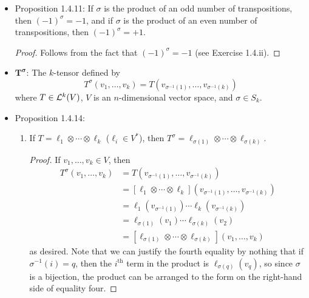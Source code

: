 \documentclass[../notes.tex]{subfiles}
\begin{document}
\begin{itemize}
\begin{proof}
\begin{align*}
            &= \prod_{i<j}\frac{x_{\sigma_1(p)}-x_{\sigma_1(q)}}{x_p-x_q}\cdot\prod_{i<j}\frac{x_{\sigma_2(i)}-x_{\sigma_2(j)}}{x_i-x_j}\\
            &= (-1)^{\sigma_1}(-1)^{\sigma_2}
        \end{align*}
        as desired.
    \end{proof}
    \item Proposition 1.4.11: If $\sigma$ is the product of an odd number of transpositions, then $(-1)^\sigma=-1$, and if $\sigma$ is the product of an even number of transpositions, then $(-1)^\sigma=+1$.
    \begin{proof}
        Follows from the fact that $(-1)^\sigma=-1$ (see Exercise 1.4.ii).
    \end{proof}
    \item $\bm{T^\sigma}$: The $k$-tensor defined by
    \begin{equation*}
        T^\sigma(v_1,\dots,v_k) = T(v_{\sigma^{-1}(1)},\dots,v_{\sigma^{-1}(k)})
    \end{equation*}
    where $T\in\lin[k]{V}$, $V$ is an $n$-dimensional vector space, and $\sigma\in S_k$.
    \item Proposition 1.4.14:
    \begin{enumerate}
        \item If $T=\ell_1\otimes\cdots\otimes\ell_k$ ($\ell_i\in V^*$), then $T^\sigma=\ell_{\sigma(1)}\otimes\cdots\otimes\ell_{\sigma(k)}$.
        \begin{proof}
            If $v_1,\dots,v_k\in V$, then
            \begin{align*}
                T^\sigma(v_1,\dots,v_k) &= T(v_{\sigma^{-1}(1)},\dots,v_{\sigma^{-1}(k)})\\
                &= [\ell_1\otimes\cdots\otimes\ell_k](v_{\sigma^{-1}(1)},\dots,v_{\sigma^{-1}(k)})\\
                &= \ell_1(v_{\sigma^{-1}(1)})\cdots\ell_k(v_{\sigma^{-1}(k)})\\
                &= \ell_{\sigma(1)}(v_1)\cdots\ell_{\sigma(k)}(v_2)\\
                &= [\ell_{\sigma(1)}\otimes\cdots\otimes\ell_{\sigma(k)}](v_1,\dots,v_k)
            \end{align*}
            as desired. Note that we can justify the fourth equality by nothing that if $\sigma^{-1}(i)=q$, then the $i^\text{th}$ term in the product is $\ell_{\sigma(q)}(v_q)$, so since $\sigma$ is a bijection, the product can be arranged to the form on the right-hand side of equality four.

\end{proof}
\end{enumerate}
\end{itemize}
\end{document}
